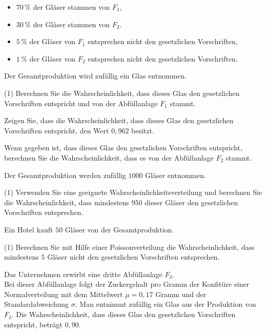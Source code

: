\documentclass{article}
\begin{document}
\begin{itemize}
    \item \(70\,\%\) der Gläser stammen von \(F_1\),
    \item \(30\,\%\) der Gläser stammen von \(F_2\).
    \item \(5\,\%\) der Gläser von \(F_1\) entsprechen nicht den gesetzlichen Vorschriften,
    \item \(1\,\%\) der Gläser von \(F_2\) entsprechen nicht den gesetzlichen Vorschriften.
\end{itemize}

\noindent Der Gesamtproduktion wird zufällig ein Glas entnommen.

\begin{tasks}(1)
    \task Berechnen Sie die Wahrscheinlichkeit, dass dieses Glas den
    gesetzlichen Vorschriften entspricht und von der Abfüllanlage \(F_1\)
    stammt.

    \task Zeigen Sie, dass die Wahrscheinlichkeit, dass dieses Glas den
    gesetzlichen Vorschriften entspricht, den Wert \(0{,}962\) besitzt.

    \task Wenn gegeben ist, dass dieses Glas den gesetzlichen Vorschriften
    entspricht, berechnen Sie die Wahrscheinlichkeit, dass es von der
    Abfüllanlage \(F_2\) stammt.
\end{tasks}

\noindent Der Gesamtproduktion werden zufällig \(1000\) Gläser entnommen.

\begin{tasks}(1)
    \task[d)] Verwenden Sie eine geeignete Wahrscheinlichkeitsverteilung und
    berechnen Sie die Wahrscheinlichkeit, dass mindestens \(950\) dieser
    Gläser den gesetzlichen Vorschriften entsprechen.
\end{tasks}

\noindent Ein Hotel kauft \(50\) Gläser von der Gesamtproduktion.

\begin{tasks}(1)
    \task[e)] Berechnen Sie mit Hilfe einer Poissonverteilung die Wahrscheinlichkeit,
    dass mindestens \(5\) Gläser nicht den gesetzlichen Vorschriften
    entsprechen.
\end{tasks}

\noindent Das Unternehmen erwirbt eine dritte Abfüllanlage \(F_3\). \\
Bei dieser Abfüllanlage folgt der Zuckergehalt pro Gramm der Konfitüre einer
Normalverteilung mit dem Mittelwert \(\mu = 0{,}17\) Gramm und der
Standardabweichung \(\sigma\).
\vspace{0.2cm}
\noindent Man entnimmt zufällig ein Glas aus der Produktion von \(F_3\).
Die Wahrscheinlichkeit, dass dieses Glas den gesetzlichen Vorschriften
entspricht, beträgt \(0{,}90\).
\end{document}
